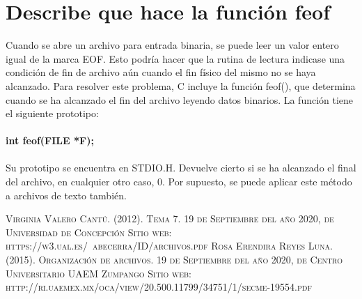 \documentclass{article}
\begin{document}
\section{Describe que hace la función feof}
    Cuando se abre un archivo para entrada binaria, se puede leer un valor entero igual de la marca EOF. Esto
    podría hacer que la rutina de lectura indicase una condición de fin de archivo aún cuando el fin físico del mismo no se
    haya alcanzado. Para resolver este problema, C incluye la función feof(), que determina cuando se ha alcanzado el
    fin del archivo leyendo datos binarios. La función tiene el siguiente prototipo:
    \\\\
    \textbf{int feof(FILE *F);}
    \\\\
    Su prototipo se encuentra en STDIO.H. Devuelve cierto si se ha alcanzado el final del archivo, en cualquier otro caso, 0. Por supuesto, se puede aplicar este método a archivos de texto también.

\begin{thebibliography}{}
 \textsc{Virginia Valero Cantú. (2012). Tema 7. 19 de Septiembre del año 2020, de Universidad de Concepción Sitio web: https://w3.ual.es/~abecerra/ID/archivos.pdf
}
 \textsc{Rosa Erendira Reyes Luna. (2015). Organización de archivos. 19 de Septiembre del año 2020, de Centro Universitario UAEM Zumpango Sitio web: http://ri.uaemex.mx/oca/view/20.500.11799/34751/1/secme-19554.pdf}

\end{thebibliography}
\end{document}
